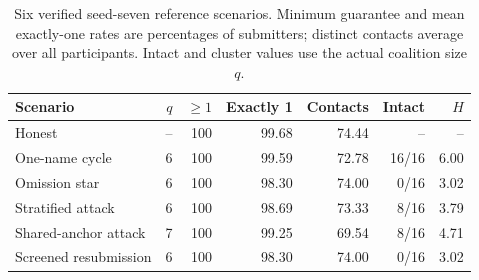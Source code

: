 \begin{table}[tb]\centering\small
\caption{Six verified seed-seven reference scenarios. Minimum guarantee and mean exactly-one rates are percentages of submitters; distinct contacts average over all participants. Intact and cluster values use the actual coalition size $q$.}\label{tab:summary}
\begin{tabular}{@{}lrrrrrr@{}}\toprule
Scenario & $q$ & $\ge1$ & Exactly 1 & Contacts & Intact & $H$ \\ \midrule
Honest & -- & 100 & 99.68 & 74.44 & -- & -- \\
One-name cycle & 6 & 100 & 99.59 & 72.78 & 16/16 & 6.00 \\
Omission star & 6 & 100 & 98.30 & 74.00 & 0/16 & 3.02 \\
Stratified attack & 6 & 100 & 98.69 & 73.33 & 8/16 & 3.79 \\
Shared-anchor attack & 7 & 100 & 99.25 & 69.54 & 8/16 & 4.71 \\
Screened resubmission & 6 & 100 & 98.30 & 74.00 & 0/16 & 3.02 \\
\bottomrule\end{tabular}\end{table}
